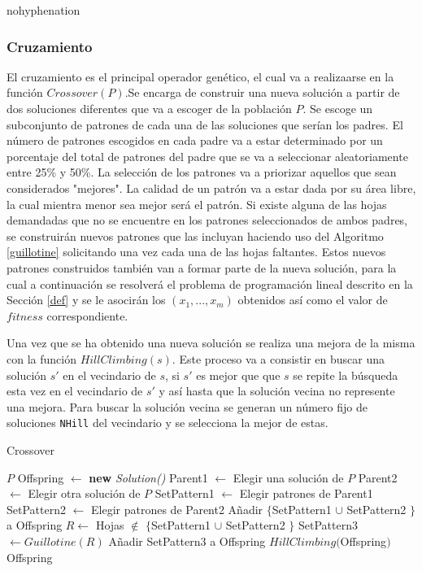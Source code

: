 \documentclass[a4paper,10pt,twocolumn]{article}
\begin{document}
\begin{hyphenrules}{nohyphenation}
\begin{itemize}
	
\end{itemize}


\subsubsection{Cruzamiento}\label{cruzamiento}
El cruzamiento es el principal operador genético, el cual va a realizaarse en la función $Crossover(P)$.Se encarga de construir una nueva solución a partir de dos soluciones diferentes que va a escoger de la población $P$. Se escoge un subconjunto de patrones de cada una de las soluciones que serían los padres. El número de patrones escogidos en cada padre va a estar determinado  por un porcentaje del total de patrones del padre que se va a seleccionar aleatoriamente entre 25\% y 50\%. La selección de los patrones va a priorizar aquellos que sean considerados "mejores". La calidad de un patrón va a estar dada por su área libre, la cual mientra menor sea mejor será el patrón. Si existe alguna de las hojas demandadas que no se encuentre en los patrones seleccionados de ambos padres, se construirán nuevos patrones que las incluyan haciendo uso del Algoritmo \ref{guillotine} solicitando una vez cada una de las hojas faltantes. Estos nuevos patrones construidos también van a formar parte de la nueva solución, para la cual a continuación se resolverá el problema de programación lineal descrito en  la Sección \ref{def} y se le asocirán los $(x_1,...,x_m)$  obtenidos así como el valor de $fitness$ correspondiente.

Una vez que se ha obtenido una nueva solución se realiza una mejora de la misma con la función $HillClimbing(s)$. Este proceso va a consistir en buscar una solución $s'$ en el vecindario de $s$, si $s'$ es mejor que que $s$ se repite la búsqueda esta vez en el vecindario de $s'$ y así hasta que la solución vecina no represente una mejora. Para buscar la solución vecina se generan un número fijo de soluciones \texttt{NHill} del vecindario y se selecciona la mejor de estas.     

\algrenewcommand{}
\algrenewcommand{}
\begin{algorithm}
	\caption{Crossover}\label{crossover}
	\begin{algorithmic}[1]
		\Require $P$
		\State Offspring $\gets$ \textbf{new} \textit{Solution()}
		\State Parent1 $\gets $ Elegir una solución de $P$
		\State Parent2 $\gets $ Elegir otra solución de $P$
		\State SetPattern1 $\gets $ Elegir patrones de Parent1
		\State SetPattern2 $\gets $ Elegir patrones de Parent2
		\State Añadir $\{$SetPattern1 $\cup$ SetPattern2 $\}$ a Offspring
		\State $R \gets $ Hojas $\notin $ $\{$SetPattern1 $\cup$ SetPattern2
		$\}$
		\State SetPattern3 $\gets Guillotine(R)$ 
		\State Añadir SetPattern3 a Offspring
		\State $ HillClimbing($Offspring$)$\\
		\Return Offspring 
	\end{algorithmic}
\end{algorithm}




\end{hyphenrules}
\end{document}
